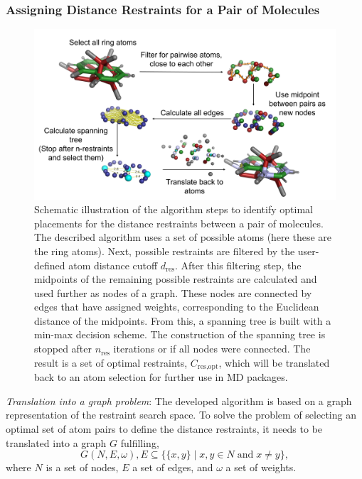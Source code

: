\subsubsection{Assigning Distance Restraints for a Pair of Molecules}
\begin{figure}[h!]
    \centering
    \includegraphics[width=\textwidth]{fig/theory/AlgorithmScheme.png}
    \caption{Schematic illustration of the algorithm steps to identify optimal placements for the distance restraints between a pair of molecules. The described algorithm uses a set of possible atoms (here these are the ring atoms). Next, possible restraints are filtered by the user-defined atom distance cutoff $d_\text{res}$. After this filtering step, the midpoints of the remaining possible restraints are calculated and used further as nodes of a graph. These nodes are connected by edges that have assigned weights, corresponding to the Euclidean distance of the midpoints. From this, a spanning tree is built with a min-max decision scheme. The construction of the spanning tree is stopped after $n_\text{res}$ iterations or if all nodes were connected. The result is a set of optimal restraints, $C_{\text{res,opt}}$, which will be translated back to an atom selection for further use in MD packages.}
    \label{fig:algorithmScheme}
\end{figure}

\noindent\textit{Translation into a graph problem}:
The developed algorithm is based on a graph representation of the restraint search space. To solve the problem of selecting an optimal set of atom pairs to define the distance restraints, it needs to be translated into a graph $G$ fulfilling,
\begin{equation}
    G(N, E, \omega), E \subseteq \{\{x,y\}\mid x,y\in N\;{\textrm {and}}\;x\neq y\},
\end{equation}
where $N$ is a set of nodes, $E$ a set of edges, and $\omega$ a set of weights.

